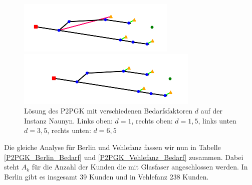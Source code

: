 \documentclass[11pt,a4paper]{article}
\theoremstyle{my_th_style1}
\begin{document}
\begin{figure}[h]
\begin{minipage}[b]{0.4\textwidth}
		\includegraphics[width=\textwidth]{./Bilder/P2PGK_Naunyn_demand3_5_duration0}
	\end{minipage}
	\begin{minipage}[b]{0.4\textwidth}
		\includegraphics[width=\textwidth]{./Bilder/P2PGK_Naunyn_demand6_5_duration0}
	\end{minipage}
	\caption{Lösung des P2PGK mit verschiedenen Bedarfsfaktoren $d$ auf der Instanz Naunyn. Links oben: $d=1$, rechts oben: $d=1,5$, links unten $d=3,5$, rechts unten: $d=6,5$}
	\label{P2PGK_Naunyn_Bedarf}
\end{figure}

Die gleiche Analyse für Berlin und Vehlefanz fassen wir nun in Tabelle \ref{P2PGK_Berlin_Bedarf} und \ref{P2PGK_Vehlefanz_Bedarf} zusammen. Dabei steht $A_k$ für die Anzahl der Kunden die mit Glasfaser angeschlossen werden. In Berlin gibt es insgesamt 39 Kunden und in Vehlefanz 238 Kunden.
\end{document}
